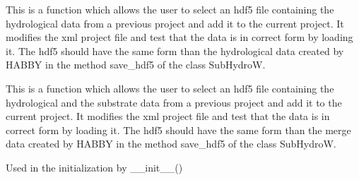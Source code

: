 \documentclass[letterpaper,10pt,english]{sphinxmanual}
\begin{document}
\begin{fulllineitems}
\begin{fulllineitems}
\end{fulllineitems}


\begin{fulllineitems}
\label{\detokenize{index:src_GUI.hydro_GUI_2.HabbyHdf5.get_new_hydro_hdf5}}
This is a function which allows the user to select an hdf5 file containing the hydrological
data from a previous project and add it to the current project. It modifies the xml project file and test
that the data is in correct form by loading it. The hdf5 should have the same form than the hydrological data
created by HABBY in the method save\_hdf5 of the class SubHydroW.

\end{fulllineitems}


\begin{fulllineitems}
\label{\detokenize{index:src_GUI.hydro_GUI_2.HabbyHdf5.get_new_merge_hdf5}}
This is a function which allows the user to select an hdf5 file containing the hydrological and the substrate
data from a previous project and add it to the current project. It modifies the xml project file and test
that the data is in correct form by loading it. The hdf5 should have the same form than the merge data
created by HABBY in the method save\_hdf5 of the class SubHydroW.

\end{fulllineitems}


\begin{fulllineitems}
\label{\detokenize{index:src_GUI.hydro_GUI_2.HabbyHdf5.init_iu}}
Used in the initialization by \_\_init\_\_()

\end{fulllineitems}


\end{fulllineitems}

\end{document}
